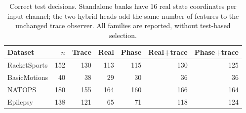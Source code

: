 \begin{table}[!htbp]
\centering\small
\begin{tabular}{lrrrrrr}
\toprule
Dataset & $n$ & Trace & Real & Phase & Real+trace & Phase+trace \\
\midrule
RacketSports & 152 & 130 & 113 & 115 & 130 & 125 \\
BasicMotions & 40 & 38 & 29 & 30 & 36 & 36 \\
NATOPS & 180 & 155 & 164 & 160 & 166 & 164 \\
Epilepsy & 138 & 121 & 65 & 71 & 118 & 124 \\
\bottomrule
\end{tabular}
\caption{Correct test decisions. Standalone banks have 16 real state coordinates per input channel; the two hybrid heads add the same number of features to the unchanged trace observer. All families are reported, without test-based selection.}
\label{tab:phase_main}
\end{table}
